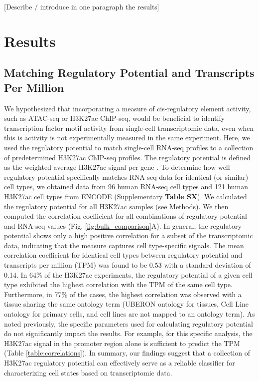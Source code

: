 [Describe / introduce in one paragraph the results]

\section{Results}

\subsection{Matching Regulatory Potential and Transcripts Per Million}

We hypothesized that incorporating a measure of cis-regulatory element activity, such as ATAC-seq or H3K27ac ChIP-seq, would be beneficial to identify transcription factor motif activity from single-cell transcriptomic data, even when this is activity is not experimentally measured in the same experiment. Here, we used the regulatory potential to match single-cell RNA-seq profiles to a collection of predetermined H3K27ac ChIP-seq profiles. The regulatory potential is defined as the weighted average H3K27ac signal per gene \cite{Wang2016}. To determine how well regulatory potential specifically matches RNA-seq data for identical (or similar) cell types, we obtained data from 96 human RNA-seq cell types and 121 human H3K27ac cell types from ENCODE\cite{encode_dcc} (Supplementary \textbf{Table SX}). We calculated the regulatory potential for all H3K27ac samples (see Methods). We then computed the correlation coefficient for all combinations of regulatory potential and RNA-seq values (Fig. \ref{fig:bulk_comparison}A). In general, the regulatory potential shows only a high positive correlation for a subset of the transcriptomic data, indicating that the measure captures cell type-specific signals. The mean correlation coefficient for identical cell types between regulatory potential and transcripts per million (TPM) was found to be 0.53 with a standard deviation of 0.14. In 64\% of the H3K27ac experiments, the regulatory potential of a given cell type exhibited the highest correlation with the TPM of the same cell type. Furthermore, in 77\% of the cases, the highest correlation was observed with a tissue sharing the same ontology term (UBERON ontology for tissues, Cell Line ontology for primary cells, and cell lines are not mapped to an ontology term). As noted previously\cite{Wang2016}, the specific parameters used for calculating regulatory potential do not significantly impact the results. For example, for this specific analysis, the H3K27ac signal in the promoter region alone is sufficient to predict the TPM (Table \ref{table:correlations}). In summary, our findings suggest that a collection of H3K27ac regulatory potential can effectively serve as a reliable classifier for characterizing cell states based on transcriptomic data.

